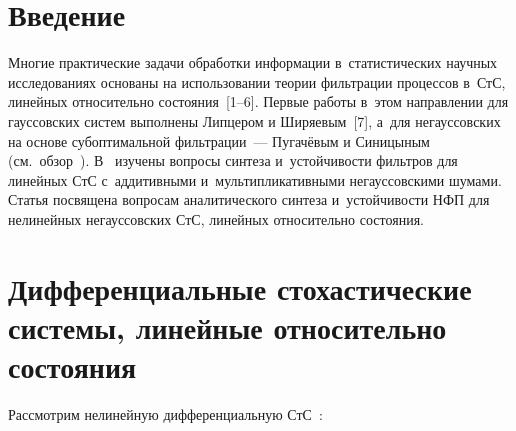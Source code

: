 \begin{multicols}{2}

\label{st\stat}



\section{Введение}

\vspace*{-4pt}

Многие практические задачи обработки информации в~статистических научных исследованиях основаны на использовании теории фильтрации процессов в~СтС, линейных относительно состояния~[1--6]. Первые работы в~этом направлении для гауссовских систем выполнены Липцером и Ширяевым~[7], а~для негауссовских на основе субоптимальной фильтрации~--- Пугачёвым и Синицыным (см.\ обзор~\cite{1-sin}). В~\cite{2-sin, 3-sin} изучены вопросы синтеза и~устойчивости фильтров для линейных СтС с~аддитивными и~мультипликативными негауссовскими шумами.
Статья посвящена вопросам аналитического синтеза и~устойчивости НФП для нелинейных негауссовских СтС, линейных относительно состояния.

\vspace*{-14pt}

\section{Дифференциальные стохастические системы, линейные относительно состояния}

\vspace*{-4pt}

Рассмотрим нелинейную дифференциальную СтС~\cite{1-sin}:


\end{multicols}
